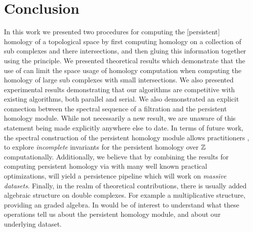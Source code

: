 \chapter{Conclusion}
In this work we presented two procedures for computing the [persistent] homology of a topological space by first computing homology on a collection of sub complexes and there intersections, and then gluing this information together using the \mv principle. We presented theoretical results which demonstrate that the use of \mv can limit the space usage of homology computation when computing the homology of large sub complexes with small intersections. We also presented experimental results demonstrating that our algorithms are competitive with existing algorithms, both parallel and serial. We also demonstrated an explicit connection between the spectral sequence of a filtration and the persistent homology module. While not necessarily a new result, we are unaware of this statement being made explicitly anywhere else to date. In terms of future work, the spectral construction of the persistent homology module allows practitioners , to explore \emph{incomplete} invariants for the persistent homology over $\mathbb{Z}$ computationally. Additionally, we believe that by combining the results for computing persistent homology via \mv with many well known practical optimizations, will yield a persistence pipeline which will work on \emph{massive datasets}. Finally, in the realm of theoretical contributions, there is usually added algebraic structure on double complexes. For example a multiplicative structure, providing an graded algebra. In would be of interest to understand what these operations tell us about the persistent homology module, and about our underlying dataset.